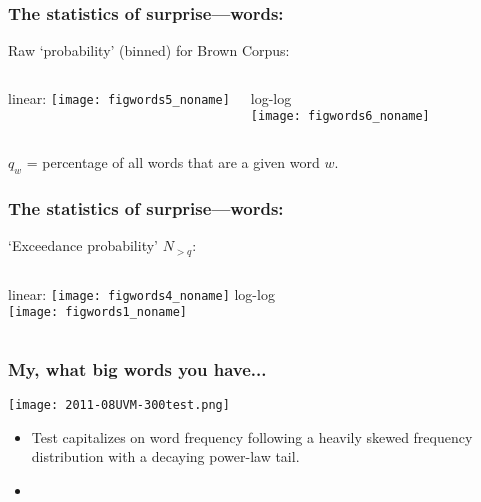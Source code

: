 \begin{frame}

  \frametitle{The statistics of surprise---words:}

  \begin{block}{Raw `probability' (binned) for Brown Corpus:}
    \begin{columns}
      linear:
      \texttt{[image: figwords5\_noname]} %
      \begin{overprint}
        log-log\\
        \texttt{[image: figwords6\_noname]} %
      \end{overprint}
    \end{columns}
    $q_w$ = percentage of all words that are a given word $w$.
  \end{block}

\end{frame}

\begin{frame}

  \frametitle{The statistics of surprise---words:}

  \begin{block}{`Exceedance probability' $N_{> q}$:}
    \begin{columns}
      linear:
      \texttt{[image: figwords4\_noname]}
      log-log\\
      \texttt{[image: figwords1\_noname]}
    \end{columns}
  \end{block}

\end{frame}


\begin{frame}
  \frametitle{My, what big words you have...}

  \begin{block}{}
    \texttt{[image: 2011-08UVM-300test.png]}

    \begin{itemize}
    \item<1->
      Test capitalizes on word frequency following a
      heavily skewed frequency distribution
      with a decaying power-law tail.
    \item<2-> 
    \end{itemize}
  \end{block}

\end{frame}


